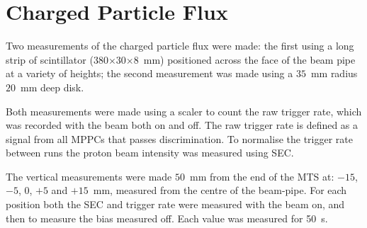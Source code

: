 
\chapter{Charged Particle Flux} %
\label{sec:charged_particle_flux}
Two measurements of the charged particle flux were made: the first using a long strip of scintillator (380\(\times\)30\(\times\)8~mm) positioned across the face of the beam pipe at a variety of heights; the second measurement was made using a \(35\)~mm radius \( 20 \)~mm deep disk. 

Both measurements were made using a scaler to count the raw trigger rate, which was recorded with the beam both on and off. The raw trigger rate is defined as a signal from all MPPCs that passes discrimination. To normalise the trigger rate between runs the proton beam intensity was measured using SEC.

The vertical measurements were made \( 50 \)~mm from the end of the MTS at: \( -15 \), \( -5 \), \( 0 \), \( +5 \) and \( +15 \)~mm, measured from the centre of the beam-pipe. For each position both the SEC and trigger rate were measured with the beam on, and then to measure the bias measured off. Each value was measured for 50~s.

